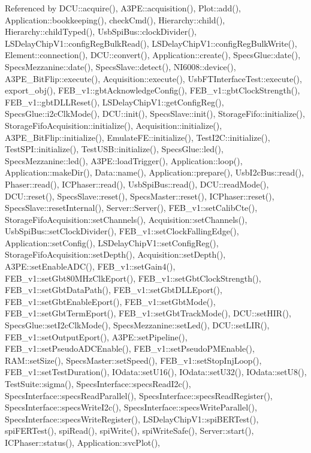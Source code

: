 Referenced by D\+C\+U\+::acquire(), A3\+P\+E\+::acquisition(), Plot\+::add(), Application\+::bookkeeping(), check\+Cmd(), Hierarchy\+::child(), Hierarchy\+::child\+Typed(), Usb\+Spi\+Bus\+::clock\+Divider(), L\+S\+Delay\+Chip\+V1\+::config\+Reg\+Bulk\+Read(), L\+S\+Delay\+Chip\+V1\+::config\+Reg\+Bulk\+Write(), Element\+::connection(), D\+C\+U\+::convert(), Application\+::create(), Specs\+Glue\+::date(), Specs\+Mezzanine\+::date(), Specs\+Slave\+::detect(), N\+I6008\+::device(), A3\+P\+E\+\_\+\+Bit\+Flip\+::execute(), Acquisition\+::execute(), Usb\+F\+T\+Interface\+Test\+::execute(), export\+\_\+obj(), F\+E\+B\+\_\+v1\+::gbt\+Acknowledge\+Config(), F\+E\+B\+\_\+v1\+::gbt\+Clock\+Strength(), F\+E\+B\+\_\+v1\+::gbt\+D\+L\+L\+Reset(), L\+S\+Delay\+Chip\+V1\+::get\+Config\+Reg(), Specs\+Glue\+::i2c\+Clk\+Mode(), D\+C\+U\+::init(), Specs\+Slave\+::init(), Storage\+Fifo\+::initialize(), Storage\+Fifo\+Acquisition\+::initialize(), Acquisition\+::initialize(), A3\+P\+E\+\_\+\+Bit\+Flip\+::initialize(), Emulate\+F\+E\+::initialize(), Test\+I2\+C\+::initialize(), Test\+S\+P\+I\+::initialize(), Test\+U\+S\+B\+::initialize(), Specs\+Glue\+::led(), Specs\+Mezzanine\+::led(), A3\+P\+E\+::load\+Trigger(), Application\+::loop(), Application\+::make\+Dir(), Data\+::name(), Application\+::prepare(), Usb\+I2c\+Bus\+::read(), Phaser\+::read(), I\+C\+Phaser\+::read(), Usb\+Spi\+Bus\+::read(), D\+C\+U\+::read\+Mode(), D\+C\+U\+::reset(), Specs\+Slave\+::reset(), Specs\+Master\+::reset(), I\+C\+Phaser\+::reset(), Specs\+Slave\+::reset\+Internal(), Server\+::\+Server(), F\+E\+B\+\_\+v1\+::set\+Calib\+Cte(), Storage\+Fifo\+Acquisition\+::set\+Channels(), Acquisition\+::set\+Channels(), Usb\+Spi\+Bus\+::set\+Clock\+Divider(), F\+E\+B\+\_\+v1\+::set\+Clock\+Falling\+Edge(), Application\+::set\+Config(), L\+S\+Delay\+Chip\+V1\+::set\+Config\+Reg(), Storage\+Fifo\+Acquisition\+::set\+Depth(), Acquisition\+::set\+Depth(), A3\+P\+E\+::set\+Enable\+A\+D\+C(), F\+E\+B\+\_\+v1\+::set\+Gain4(), F\+E\+B\+\_\+v1\+::set\+Gbt80\+M\+Hz\+Clk\+Eport(), F\+E\+B\+\_\+v1\+::set\+Gbt\+Clock\+Strength(), F\+E\+B\+\_\+v1\+::set\+Gbt\+Data\+Path(), F\+E\+B\+\_\+v1\+::set\+Gbt\+D\+L\+L\+Eport(), F\+E\+B\+\_\+v1\+::set\+Gbt\+Enable\+Eport(), F\+E\+B\+\_\+v1\+::set\+Gbt\+Mode(), F\+E\+B\+\_\+v1\+::set\+Gbt\+Term\+Eport(), F\+E\+B\+\_\+v1\+::set\+Gbt\+Track\+Mode(), D\+C\+U\+::set\+H\+I\+R(), Specs\+Glue\+::set\+I2c\+Clk\+Mode(), Specs\+Mezzanine\+::set\+Led(), D\+C\+U\+::set\+L\+I\+R(), F\+E\+B\+\_\+v1\+::set\+Output\+Eport(), A3\+P\+E\+::set\+Pipeline(), F\+E\+B\+\_\+v1\+::set\+Pseudo\+A\+D\+C\+Enable(), F\+E\+B\+\_\+v1\+::set\+Pseudo\+P\+M\+Enable(), R\+A\+M\+::set\+Size(), Specs\+Master\+::set\+Speed(), F\+E\+B\+\_\+v1\+::set\+Stop\+Inj\+Loop(), F\+E\+B\+\_\+v1\+::set\+Test\+Duration(), I\+Odata\+::set\+U16(), I\+Odata\+::set\+U32(), I\+Odata\+::set\+U8(), Test\+Suite\+::sigma(), Specs\+Interface\+::specs\+Read\+I2c(), Specs\+Interface\+::specs\+Read\+Parallel(), Specs\+Interface\+::specs\+Read\+Register(), Specs\+Interface\+::specs\+Write\+I2c(), Specs\+Interface\+::specs\+Write\+Parallel(), Specs\+Interface\+::specs\+Write\+Register(), L\+S\+Delay\+Chip\+V1\+::spi\+B\+E\+R\+Test(), spi\+F\+E\+R\+Test(), spi\+Read(), spi\+Write(), spi\+Write\+Safe(), Server\+::start(), I\+C\+Phaser\+::status(), Application\+::svc\+Plot(), 